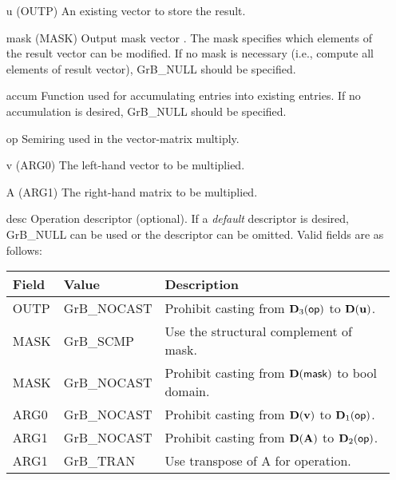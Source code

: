 \begin{itemize}[leftmargin=1.1in]
    \item[{\sf u}]    ({\sf OUTP}) An existing vector to store the result.

    \item[{\sf mask}] ({\sf MASK}) Output mask vector . The mask
    specifies which elements of the result vector can be modified.
    If no mask is necessary (i.e., compute all elements of result
    vector), {\sf GrB\_NULL} should be specified.

	\item[{\sf accum}]  Function used for accumulating entries into existing
                         entries. If no accumulation is desired,
	                    {\sf GrB\_NULL} should be specified.

    \item[{\sf op}]   Semiring used in the vector-matrix multiply.
    \item[{\sf v}]    ({\sf ARG0}) The left-hand vector to be multiplied.
    \item[{\sf A}]    ({\sf ARG1}) The right-hand matrix to be multiplied.

    \item[{\sf desc}]  Operation descriptor (optional). If a
    \emph{default} descriptor is desired, {\sf GrB\_NULL} can be
    used or the descriptor can be omitted. Valid fields are as follows: \\
    \begin{tabular}{lll}
    Field  & Value & Description \\
    \hline
    {\sf OUTP} & {\sf GrB\_NOCAST} & Prohibit casting from $\bold{D}_3({\sf op})$ to $\bold{D}({\bf u})$.\\
    {\sf MASK} & {\sf GrB\_SCMP}   & Use the structural complement of {\sf mask}. \\
    {\sf MASK} & {\sf GrB\_NOCAST} & Prohibit casting from $\bold{D}({\sf mask})$ to {\sf bool} domain. \\
    {\sf ARG0} & {\sf GrB\_NOCAST} & Prohibit casting from $\bold{D}({\bf v})$ to $\bold{D}_1({\sf op})$. \\
    {\sf ARG1} & {\sf GrB\_NOCAST} & Prohibit casting from $\bold{D}({\bf A})$ to $\bold{D}_2({\sf op})$. \\
    {\sf ARG1} & {\sf GrB\_TRAN} & Use transpose of {\sf A} for operation. \\
    \end{tabular}
\end{itemize}

